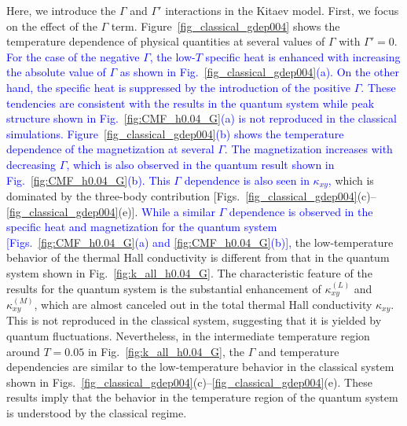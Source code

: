 \documentclass[reprint,amsmath,amssymb,aps,prx]{revtex4-2}
\newcommand{\blue}[1]{\textcolor{blue}{#1}}
\begin{document}
Here, we introduce the $\Gamma$ and $\Gamma'$ interactions in the Kitaev model.
First, we focus on the effect of the $\Gamma$ term.
Figure~\ref{fig_classical_gdep004} shows the temperature dependence of physical quantities at several values of $\Gamma$ with $\Gamma'=0$.
\blue{For the case of the negative $\Gamma$, the low-$T$ specific heat is enhanced with increasing the absolute value of $\Gamma$ as shown in Fig.~\ref{fig_classical_gdep004}(a).
On the other hand, the specific heat is suppressed by the introduction of the positive $\Gamma$.
These tendencies are consistent with the results in the quantum system while peak structure shown in Fig.~\ref{fig:CMF_h0.04_G}(a) is not reproduced in the classical simulations.
Figure~\ref{fig_classical_gdep004}(b) shows the temperature dependence of the magnetization at several $\Gamma$.
The magnetization increases with decreasing $\Gamma$, which is also observed in the quantum result shown in Fig.~\ref{fig:CMF_h0.04_G}(b).
}
\blue{This $\Gamma$ dependence is also seen in $\kappa_{xy}$,}
which is dominated by the three-body contribution [Figs.~\ref{fig_classical_gdep004}(c)--\ref{fig_classical_gdep004}(e)].
\blue{While a similar $\Gamma$ dependence is observed in the specific heat and magnetization for the quantum system [Figs.~\ref{fig:CMF_h0.04_G}(a) and \ref{fig:CMF_h0.04_G}(b)],}
 the low-temperature behavior of the thermal Hall conductivity is different from that in the quantum system shown in Fig.~\ref{fig:k_all_h0.04_G}.
The characteristic feature of the results for the quantum system is the substantial enhancement of $\kappa_{xy}^{(L)}$ and $\kappa_{xy}^{(M)}$, which are almost canceled out in the total thermal Hall conductivity $\kappa_{xy}$.
This is not reproduced in the classical system, suggesting that it is yielded by quantum fluctuations.
Nevertheless, in the intermediate temperature region around $T=0.05$ in Fig.~\ref{fig:k_all_h0.04_G}, the $\Gamma$ and temperature dependencies are similar to the low-temperature behavior in the classical system shown in Figs.~\ref{fig_classical_gdep004}(c)--\ref{fig_classical_gdep004}(e).
These results imply that the behavior in the temperature region of the quantum system is understood by the classical regime.
\end{document}
